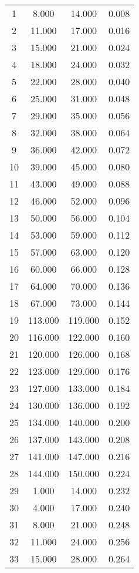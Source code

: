 % 
\begin{tabular}{cccc}
  \hline
  \hline
1 & 8.000 & 14.000 & 0.008 \\ 
  2 & 11.000 & 17.000 & 0.016 \\ 
  3 & 15.000 & 21.000 & 0.024 \\ 
  4 & 18.000 & 24.000 & 0.032 \\ 
  5 & 22.000 & 28.000 & 0.040 \\ 
  6 & 25.000 & 31.000 & 0.048 \\ 
  7 & 29.000 & 35.000 & 0.056 \\ 
  8 & 32.000 & 38.000 & 0.064 \\ 
  9 & 36.000 & 42.000 & 0.072 \\ 
  10 & 39.000 & 45.000 & 0.080 \\ 
  11 & 43.000 & 49.000 & 0.088 \\ 
  12 & 46.000 & 52.000 & 0.096 \\ 
  13 & 50.000 & 56.000 & 0.104 \\ 
  14 & 53.000 & 59.000 & 0.112 \\ 
  15 & 57.000 & 63.000 & 0.120 \\ 
  16 & 60.000 & 66.000 & 0.128 \\ 
  17 & 64.000 & 70.000 & 0.136 \\ 
  18 & 67.000 & 73.000 & 0.144 \\ 
  19 & 113.000 & 119.000 & 0.152 \\ 
  20 & 116.000 & 122.000 & 0.160 \\ 
  21 & 120.000 & 126.000 & 0.168 \\ 
  22 & 123.000 & 129.000 & 0.176 \\ 
  23 & 127.000 & 133.000 & 0.184 \\ 
  24 & 130.000 & 136.000 & 0.192 \\ 
  25 & 134.000 & 140.000 & 0.200 \\ 
  26 & 137.000 & 143.000 & 0.208 \\ 
  27 & 141.000 & 147.000 & 0.216 \\ 
  28 & 144.000 & 150.000 & 0.224 \\ 
  29 & 1.000 & 14.000 & 0.232 \\ 
  30 & 4.000 & 17.000 & 0.240 \\ 
  31 & 8.000 & 21.000 & 0.248 \\ 
  32 & 11.000 & 24.000 & 0.256 \\ 
  33 & 15.000 & 28.000 & 0.264 \\ 

\end{tabular}
